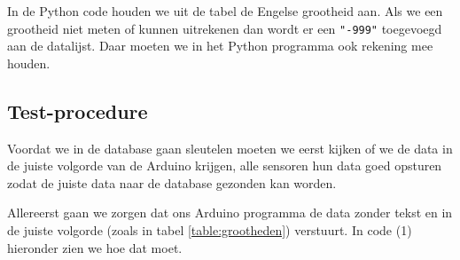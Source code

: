 In de Python code houden we uit de tabel de Engelse grootheid aan. Als we een grootheid
niet meten of kunnen uitrekenen dan wordt er een \verb|"-999"| toegevoegd aan de datalijst.
Daar moeten we in het Python programma ook rekening mee houden.


\subsection{Test-procedure}

Voordat we in de database gaan sleutelen moeten we eerst kijken of we de
data in de juiste volgorde van de Arduino krijgen, alle sensoren hun data goed opsturen
zodat de juiste data naar de \hisparc database gezonden kan worden.

Allereerst gaan we zorgen dat ons Arduino programma de data zonder tekst en
in de juiste volgorde (zoals in tabel \ref{table:grootheden}) verstuurt.
In code (1) hieronder zien we hoe dat moet.

